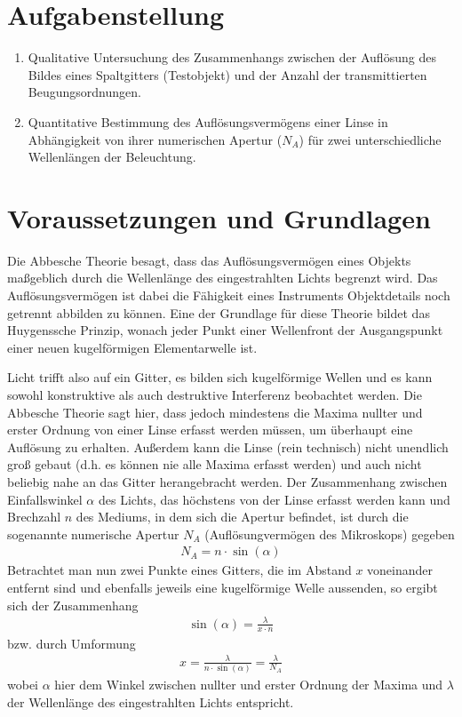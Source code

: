 \documentclass{article}
\begin{document}
\parindent0cm




\pagestyle{fancy}

\tableofcontents
\newpage


\section{Aufgabenstellung}

\begin{enumerate}
\item Qualitative  Untersuchung des Zusammenhangs zwischen der  Auflösung  des  Bildes  eines Spaltgitters (Testobjekt) und der Anzahl der transmittierten Beugungsordnungen.
\item Quantitative Bestimmung  des Auflösungsvermögens  einer  Linse  in Abhängigkeit  von  ihrer numerischen Apertur ($N_A$) für zwei unterschiedliche Wellenlängen der Beleuchtung.
\end{enumerate}


\section{Voraussetzungen und Grundlagen}

Die Abbesche Theorie besagt, dass das Auflösungsvermögen eines Objekts maßgeblich durch die Wellenlänge des eingestrahlten Lichts begrenzt wird. Das Auflösungsvermögen ist dabei die Fähigkeit eines Instruments Objektdetails noch getrennt abbilden zu können. Eine der Grundlage für diese Theorie bildet das Huygenssche Prinzip, wonach jeder Punkt einer Wellenfront der Ausgangspunkt einer neuen kugelförmigen Elementarwelle ist.

Licht trifft also auf ein Gitter, es bilden sich kugelförmige Wellen und es kann sowohl konstruktive als auch destruktive Interferenz beobachtet werden. Die Abbesche Theorie sagt hier, dass jedoch mindestens die Maxima nullter und erster Ordnung von einer Linse erfasst werden müssen, um überhaupt eine Auflösung zu erhalten. Außerdem kann die Linse (rein technisch) nicht unendlich groß gebaut (d.h. es können nie alle Maxima erfasst werden) und auch nicht beliebig nahe an das Gitter herangebracht werden. Der Zusammenhang zwischen Einfallswinkel $\alpha$ des Lichts, das höchstens von der Linse erfasst werden kann und Brechzahl $n$ des Mediums, in dem sich die Apertur befindet, ist durch die sogenannte numerische Apertur $N_A$ (Auflösungvermögen des Mikroskops) gegeben
\begin{align}
N_A = n\cdot\sin(\alpha)
\end{align}
Betrachtet man nun zwei Punkte eines Gitters, die im Abstand $x$ voneinander entfernt sind und ebenfalls jeweils eine kugelförmige Welle aussenden, so ergibt sich der Zusammenhang
\begin{align}
\sin(\alpha) = \frac{\lambda}{x\cdot n}
\end{align}
bzw. durch Umformung
\begin{align}
x = \frac{\lambda}{n\cdot \sin(\alpha)} = \frac{\lambda}{N_A} 
\end{align}
wobei $\alpha$ hier dem Winkel zwischen nullter und erster Ordnung der Maxima und $\lambda$ der Wellenlänge des eingestrahlten Lichts entspricht.
\end{document}
